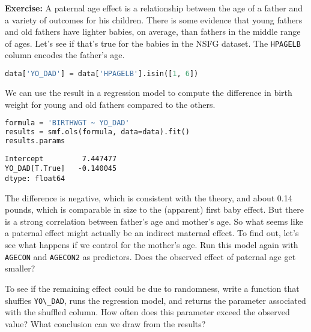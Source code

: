 \textbf{Exercise:} A paternal age effect is a relationship between the
age of a father and a variety of outcomes for his children. There is
some evidence that young fathers and old fathers have lighter babies, on
average, than fathers in the middle range of ages. Let's see if that's
true for the babies in the NSFG dataset. The
\passthrough{\lstinline!HPAGELB!} column encodes the father's age.

\begin{lstlisting}[language=Python,style=source]
data['YO_DAD'] = data['HPAGELB'].isin([1, 6])
\end{lstlisting}

We can use the result in a regression model to compute the difference in
birth weight for young and old fathers compared to the others.

\begin{lstlisting}[language=Python,style=source]
formula = 'BIRTHWGT ~ YO_DAD'
results = smf.ols(formula, data=data).fit()
results.params
\end{lstlisting}

\begin{lstlisting}[style=output]
Intercept         7.447477
YO_DAD[T.True]   -0.140045
dtype: float64
\end{lstlisting}

The difference is negative, which is consistent with the theory, and
about 0.14 pounds, which is comparable in size to the (apparent) first
baby effect. But there is a strong correlation between father's age and
mother's age. So what seems like a paternal effect might actually be an
indirect maternal effect. To find out, let's see what happens if we
control for the mother's age. Run this model again with
\passthrough{\lstinline!AGECON!} and \passthrough{\lstinline!AGECON2!}
as predictors. Does the observed effect of paternal age get smaller?

To see if the remaining effect could be due to randomness, write a
function that shuffles \passthrough{\lstinline!YO\_DAD!}, runs the
regression model, and returns the parameter associated with the shuffled
column. How often does this parameter exceed the observed value? What
conclusion can we draw from the results?

